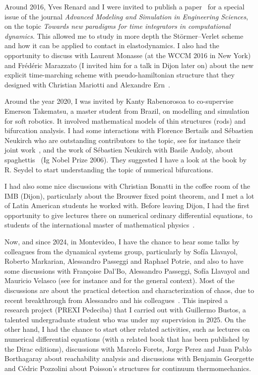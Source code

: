 \documentclass[11pt]{article}
\begin{document}
\medskip

Around 2016, Yves Renard and I were invited to publish a paper~\cite{chouly2018explicit} for a special issue of the journal \emph{Advanced Modeling and Simulation in Engineering Sciences}, on the topic \emph{Towards new paradigms for time integrators in computational dynamics}. This allowed me to study in more depth the St\"ormer--Verlet scheme and how it can be applied to contact in elastodynamics. I also had the opportunity to discuss with Laurent Monasse (at the WCCM 2016 in New York) and Fr\'ed\'eric Marazzato (I invited him for a talk in Dijon later on) about the new explicit time-marching scheme with pseudo-hamiltonian structure that they designed with Christian Mariotti and Alexandre Ern~\cite{marazzato2019}.

\medskip

Around the year 2020, I was invited by Kanty Rabenorosoa to co-supervise Emerson Takematsu, a master student from Brazil, on modelling and simulation for soft robotics. It involved mathematical models of thin structures (rods) and bifurcation analysis. I had some interactions with Florence Bertails and S\'ebastien Neukirch who are outstanding contributors to the topic, see for instance their joint work~\cite{bertails2025noether}, and the work of S\'ebastien Neukirch with Basile Audoly, about spaghettis~\cite{audoly2005spaghetti} (Ig Nobel Prize 2006). They suggested I have a look at the book by R. Seydel to start understanding the topic of numerical bifurcations. 

\medskip

I had also some nice discussions with
Christian Bonatti in the coffee room of the IMB (Dijon), particularly about the Brouwer fixed point theorem, and I met a lot of Latin American students he worked with.
%
Before leaving Dijon, I had the first opportunity to give lectures there on numerical ordinary differential equations, to students of the international master of mathematical physics~\cite{chouly:hal-03212748}.

\medskip

Now, and since 2024, in Montevideo, I have the chance to hear some talks by colleagues from the dynamical systems group, particularly by Sof\'ia Llavayol, Roberto Markarian, Alessandro Passeggi and Raphael Potrie, and also to have some discussions with Fran\c{c}oise Dal'Bo, Alessandro Passeggi, Sof\'ia Llavayol and Mauricio Velasco (see for instance
\cite{dalbo2026ifumi} and \cite{markarian2025dimension} for the general context). Most of the discussions are about the practical detection and characterization of chaos, due to recent breakthrough from Alessandro and his colleagues~\cite{capi,passeggi2026conditions}.
This inspired a research project (PREXI Pedeciba) that I carried out with Guillermo Bustos, a talented undergraduate student who was under my supervision in 2025. 
On the other hand, I had the chance to start other related activities, such as lectures on numerical differential equations (with a related book that has been published by the Dirac editions), discussions with Marcelo Forets, Jorge Perez and Juan Pablo Borthagaray about reachability analysis and discussions with Benjamin Georgette and C\'edric Pozzolini about Poisson's structures for continuum thermomechanics. 
\end{document}
